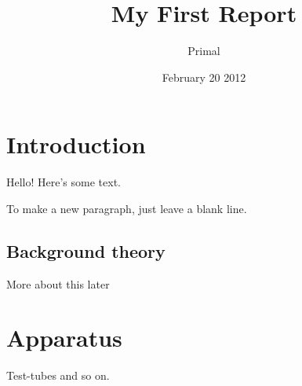 \documentclass{article} %
\title{My First Report}
\author{Primal}
\date{February 20 2012}
\begin{document}
\maketitle %
\tableofcontents %
\section{Introduction}
Hello!  Here's some text.

To make a new paragraph, just leave a blank line.

\subsection{Background theory}
More about this later

\section{Apparatus}
Test-tubes and so on.
\end{document}
